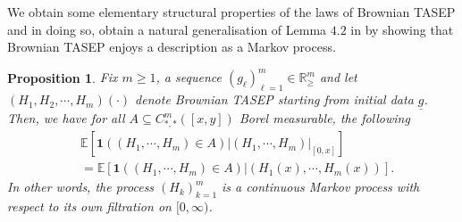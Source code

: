 \documentclass[11pt, reqno]{amsart}
\numberwithin{equation}{section}
\newcounter{dummy} \numberwithin{dummy}{section}
\newtheorem{proposition}[dummy]{Proposition}
\newcommand{\R}{\ensuremath{\mathbb{R}}}
\begin{document}
We obtain some elementary structural properties of the laws of Brownian TASEP and in doing so, obtain a natural generalisation of Lemma $4.2$ in \cite{Sarkar2021Brownian} by showing that Brownian TASEP enjoys a description as a Markov process.
\begin{proposition}\label{prop: generalised Markov}
     Fix $m\ge 1$, a sequence $(g_\ell)_{\ell =1}^m \in\R^m_{\ge}$ and let $(H_1, H_2, \cdots, H_m)(\cdot)$ denote Brownian TASEP starting from initial data $\underline{g}$. Then, we have for all $A\subseteq C_{*, *}^m ([x,y])$ Borel measurable, the following
\begin{equation*}
\begin{array}{cc}
     &\mathbb{E}\left[ \mathbf{1}((H_1, \cdots, H_{m})\in A) | (H_1, \cdots, H_m)|_{[0,x]}\right]\\ &=  \mathbb{E}\left[ \mathbf{1}((H_1, \cdots, H_{m})\in A) | (H_1(x), \cdots, H_m(x))\right].
\end{array}
\end{equation*}
In other words, the process $(H_k)_{k=1}^m$ is a continuous Markov process with respect to its own filtration on $[0,\infty)$.
\end{proposition}
\end{document}
